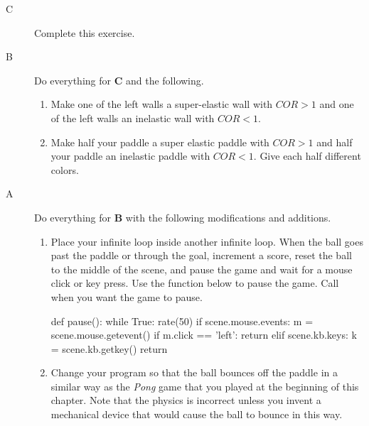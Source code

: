\begin{description}

\item[C] Complete this exercise.

\item[B] Do everything for {\bf C} and the following.

\begin{enumerate}
	\item Make one of the left walls a super-elastic wall with $COR>1$ and one of the left walls an inelastic wall with $COR<1$.
	\item Make half your paddle a super elastic paddle with $COR>1$ and half your paddle an inelastic paddle with $COR<1$. Give each half different colors.
\end{enumerate}

\item[A] Do everything for {\bf B} with the following modifications and additions.

\begin{enumerate}
	\item Place your infinite loop inside another infinite loop. When the ball goes past the paddle or through the goal, increment a score, reset the ball to the middle of the scene, and pause the game and wait for a mouse click or key press. Use the function below to pause the game. Call  when you want the game to pause.

\begin{myvpython}
def pause():
    while True:
        rate(50)
        if scene.mouse.events:
            m = scene.mouse.getevent()
            if m.click == 'left': return
        elif scene.kb.keys:
            k = scene.kb.getkey()
            return
\end{myvpython}

	\item Change your program so that the ball bounces off the paddle in a similar way as the \emph{Pong} game that you played at the beginning of this chapter. Note that the physics is incorrect unless you invent a mechanical device that would cause the ball to bounce in this way.
	
\end{enumerate}




\end{description}

